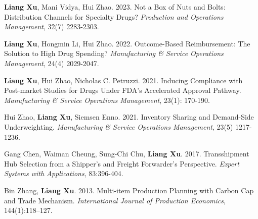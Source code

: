 \documentclass[a4paper, 10pt]{article}
\begin{document}
{\item \textbf{Liang Xu}, Mani Vidya, Hui Zhao. 2023. Not a Box of Nuts and Bolts: Distribution Channels for Specialty Drugs? \textit{Production and Operations Management}, 32(7) 2283-2303.
\item \textbf{Liang Xu}, Hongmin Li, Hui Zhao. 2022. Outcome-Based Reimbursement: The Solution to High Drug Spending? \textit{Manufacturing \& Service Operations Management}, 24(4) 2029-2047.
\item \textbf{Liang Xu}, Hui Zhao, Nicholas C. Petruzzi. 2021. Inducing Compliance with Post-market Studies for Drugs Under FDA’s Accelerated Approval Pathway. \textit{Manufacturing \& Service Operations Management}, 23(1): 170-190.
\itemListStart
\itemListEnd
\item Hui Zhao, \textbf{Liang Xu}, Siemsen Enno. 2021. Inventory Sharing and Demand-Side Underweighting. \textit{Manufacturing \& Service Operations Management}, 23(5) 1217-1236.
\item Gang Chen, Waiman Cheung, Sung-Chi Chu, \textbf{Liang Xu}. 2017. Transshipment Hub Selection from a Shipper's and Freight Forwarder's Perspective. \textit{Expert Systems with Applications}, 83:396-404.
\item Bin Zhang, \textbf{Liang Xu}. 2013. Multi-item Production Planning with Carbon Cap and Trade Mechanism. \textit{International Journal of Production Economics}, 144(1):118–127.
\pubListEnd
}
\end{document}
